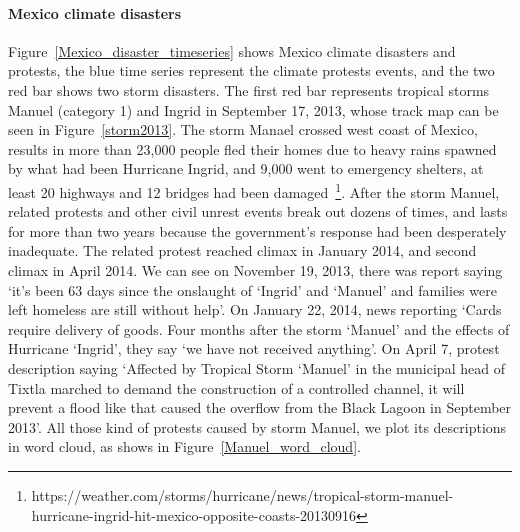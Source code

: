 \documentclass[9pt,twocolumn,twoside]{pnas-new}
\begin{document}
\paragraph{Mexico climate disasters}
Figure~\ref{Mexico_disaster_timeseries} shows Mexico climate disasters and protests, the blue time series represent the climate protests events, and the two red bar shows two storm disasters. The first red bar represents tropical storms Manuel (category 1) and Ingrid in September 17, 2013, whose track map can be seen in Figure~\ref{storm2013}. The storm Manael crossed west coast of Mexico, results in more than 23,000 people fled their homes due to heavy rains spawned by what had been Hurricane Ingrid, and 9,000 went to emergency shelters, at least 20 highways and 12 bridges had been damaged~\footnote{https://weather.com/storms/hurricane/news/tropical-storm-manuel-hurricane-ingrid-hit-mexico-opposite-coasts-20130916}.
After the storm Manuel, related protests and other civil unrest events break out dozens of times, and lasts for more than two years because the government's response had been desperately inadequate. The related protest reached climax in January 2014, and second climax in April 2014. We can see on November 19, 2013, there was report saying `it's been 63 days since the onslaught of `Ingrid' and `Manuel' and families were left homeless are still without help'. On January 22, 2014, news reporting `Cards require delivery of goods. Four months after the storm `Manuel' and the effects of Hurricane `Ingrid', they say `we have not received anything'. On April 7, protest description saying `Affected by Tropical Storm `Manuel' in the municipal head of Tixtla marched to demand the construction of a controlled channel, it will prevent a flood like that caused the overflow from the Black Lagoon in September 2013'. All those kind of protests caused by storm Manuel, we plot its descriptions in word cloud, as shows in Figure~\ref{Manuel_word_cloud}.
\end{document}
